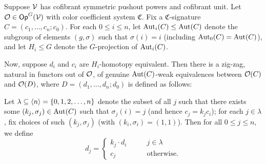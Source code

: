 \documentclass[a4paper,10pt
,draft
]{article}%
\renewcommand{\1}{\eta}%
\begin{document}
\begin{lemma}
      \label{CAV_4.14_PROP2}
      Suppose $\mathcal V$ has cofibrant symmetric pushout powers and cofibrant unit.
      Let $\mathcal{O} \in \mathsf{Op}^G(\mathcal V)$ with color coefficient system $\mathfrak C$.
      Fix a $\mathfrak C$-signature $C = (c_1,\dots, c_n;c_0)$.
      For each $0 \leq i \leq n$, let $\operatorname{Aut}_i(C) \leq \operatorname{Aut}(C)$ denote the subgroup of elements $(g, \sigma)$ such that $\sigma(i) = i$ (including $\operatorname{Aut}_0(C) = \operatorname{Aut}(C)$),
      and let $H_i \leq G$ denote the $G$-projection of $\operatorname{Aut}_i(C)$.

      Now, suppose $d_i$ and $c_i$ are $H_i$-homotopy equivalent.
      Then there is a zig-zag, natural in functors out of $\mathcal{O}$,
      of genuine $\operatorname{Aut}(C)$-weak equivalences between $\mathcal{O}(C)$ and $\mathcal{O}(D)$, where $D = (d_1,\dots, d_n;d_0)$ is defined as follows:
      
      Let $\lambda \subseteq \langle n \rangle = \left\{0,1,2,\dots,n\right\}$ denote the subset of all $j$ such that
      there exists some $(k_j, \sigma_j) \in \operatorname{Aut}(C)$ such that $\sigma_j(i) = j$ (and hence $c_j = k_j c_i$);
      for each $j \in \lambda$, fix choices of such $(k_j, \sigma_j)$ (with $(k_i,\sigma_i) = (1,1)$).
      Then for all $0 \leq j \leq n$, we define
      \[
            d_j =
            \begin{cases}
                  k_j \cdot d_i \qquad & j \in \lambda
                  \\
                  c_j & \mbox{otherwise.}
            \end{cases}
      \]
\end{lemma}
\end{document}
